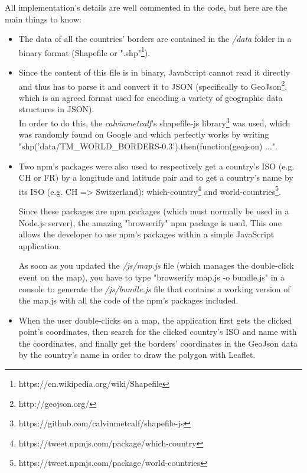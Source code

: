\documentclass[a4paper,11pt]{report}
\begin{document}
All implementation's details are well commented in the code, but here are the main things to know:
\begin{itemize}
	\item The data of all the countries' borders are contained in the \emph{/data} folder in a binary format (Shapefile or ".shp"\footnote{https://en.wikipedia.org/wiki/Shapefile}).
	\item Since the content of this file is in binary, JavaScript cannot read it directly and thus has to parse it and convert it to JSON (specifically to GeoJson\footnote{http://geojson.org/}, which is an agreed format used for encoding a variety of geographic data structures in JSON).\\
	
	In order to do this, the \emph{calvinmetcalf}'s shapefile-js library\footnote{https://github.com/calvinmetcalf/shapefile-js} was used, which was randomly found on Google and which perfectly works by writing "shp('data/TM\_WORLD\_BORDERS-0.3').then(function(geojson) {...}".
	\item Two npm's packages were also used to respectively get a country's ISO (e.g. CH or FR) by a longitude and latitude pair and to get a country's name by its ISO (e.g. CH => Switzerland): which-country\footnote{https://tweet.npmjs.com/package/which-country} and world-countries\footnote{https://tweet.npmjs.com/package/world-countries}.
	
	Since these packages are npm packages (which must normally be used in a Node.js server), the amazing "browserify" npm package is used. This one allows the developer to use npm's packages within a simple JavaScript application.
	
	As soon as you updated the \emph{/js/map.js} file (which manages the double-click event on the map), you have to type "browserify map.js -o bundle.js" in a console to generate the \emph{/js/bundle.js} file that contains a working version of the map.js with all the code of the npm's packages included.
	\item When the user double-clicks on a map, the application first gets the clicked point's coordinates, then search for the clicked country's ISO and name with the coordinates, and finally get the borders' coordinates in the GeoJson data by the country's name in order to draw the polygon with Leaflet.
\end{itemize}
\bigskip
\end{document}
